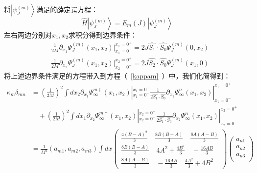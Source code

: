 将$\left|\psi^{(m)}_J\right>$满足的薛定谔方程：
\begin{equation}
\hat{H} \left|\psi^{(m)}_J\right> = E_m(J)\left|\psi^{(m)}_J\right>
\end{equation}
左右两边分别对$x_1,x_2$求积分得到边界条件：
    \begin{equation}
        \begin{split}
            &\frac{1}{2M}\partial_{x_1} \Psi^{(m)}_J(x_1,x_2)|_{x_1=0^-}^{x_1=0^+}= 2J \hat{S_1}\cdot \hat{S_0}\Psi^{(m)}_J(0,x_2) \\
            &\frac{1}{2M}\partial_{x_2} \Psi^{(m)}_J(x_1,x_2)|_{x_2=0^-}^{x_2=0^+}= 2J \hat{S_2}\cdot \hat{S_0} \Psi^{(m)}_J(x_1,0)
        \end{split}
    \end{equation}
将上述边界条件满足的方程带入到方程（~\ref{kappam}~）中，我们化简得到：
\begin{equation}\label{kappammid}
    \begin{split}
            \kappa_m \delta_{mn} &=  (\frac{1}{2M})^2 \int dx_2 \partial_{x_1} \Psi^{m\dagger}_{\infty}(x_1,x_2) |^{x_1=0^+}_{x_1 = 0^-} \frac{1}{2\hat{S_1}\cdot \hat{S_0}} \partial_{x_1} \Psi^{n}_{\infty}(x_1,x_2) |^{x_1=0^+}_{x_1 = 0^-}\\
            & \quad +  (\frac{1}{2M})^2 \int dx_1 \partial_{x_2} \Psi^{m\dagger}_{\infty}(x_1,x_2) |^{x_2=0^+}_{x_2 = 0^-} \frac{1}{2\hat{S_1}\cdot \hat{S_0}} \partial_{x_2} \Psi^{n}_{\infty}(x_1,x_2) |^{x_2=0^+}_{x_2 = 0^-}\\
           &= \frac{1}{M^2}(a_{m1},a_{m2},a_{m3}) \int dx
            \left(
            \begin{array}{c}
                \frac{4(B-A)^2}{3} \quad \frac{8B(B-A)}{3}  \quad \frac{8A(A-B)}{3}\\
                \frac{8B(B-A)}{3} \quad 4 A^2+\frac{4 B^2}{3}  \quad -\frac{16AB}{3} \\
                \frac{8A(A-B)}{3} \quad  -\frac{16AB}{3} \quad \frac{4 A^2}{3}+4 B^2
            \end{array}
            \right) 
            \left(
            \begin{array}{c}
                a_{n1}\\
                a_{n2}\\
                a_{n3}\\
            \end{array}
            \right)\\
    \end{split}
\end{equation} 

